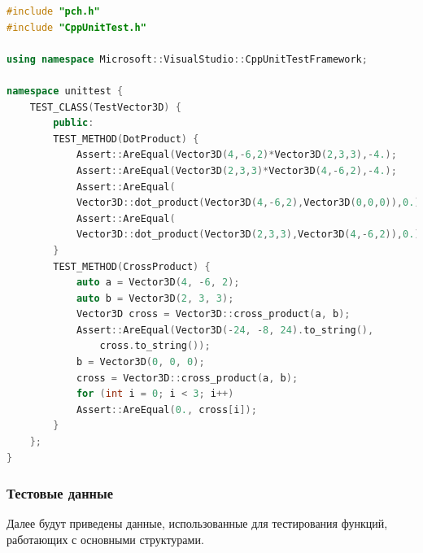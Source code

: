 \begin{lstlisting}[caption={Класс, реализующий тестирование методов для работы с трёхмерным вектором},label={lst:testcode},language=c++]
#include "pch.h"
#include "CppUnitTest.h"

using namespace Microsoft::VisualStudio::CppUnitTestFramework;

namespace unittest {	
	TEST_CLASS(TestVector3D) {
		public:
		TEST_METHOD(DotProduct) {
			Assert::AreEqual(Vector3D(4,-6,2)*Vector3D(2,3,3),-4.);
			Assert::AreEqual(Vector3D(2,3,3)*Vector3D(4,-6,2),-4.);
			Assert::AreEqual(
			Vector3D::dot_product(Vector3D(4,-6,2),Vector3D(0,0,0)),0.);
			Assert::AreEqual(
			Vector3D::dot_product(Vector3D(2,3,3),Vector3D(4,-6,2)),0.);
		}
		TEST_METHOD(CrossProduct) {
			auto a = Vector3D(4, -6, 2);
			auto b = Vector3D(2, 3, 3);
			Vector3D cross = Vector3D::cross_product(a, b);
			Assert::AreEqual(Vector3D(-24, -8, 24).to_string(),
				cross.to_string());
			b = Vector3D(0, 0, 0);
			cross = Vector3D::cross_product(a, b);
			for (int i = 0; i < 3; i++)
			Assert::AreEqual(0., cross[i]);
		}
	};
}
\end{lstlisting}

\subsubsection{Тестовые данные}
Далее будут приведены данные, использованные для тестирования функций, работающих с основными структурами.

